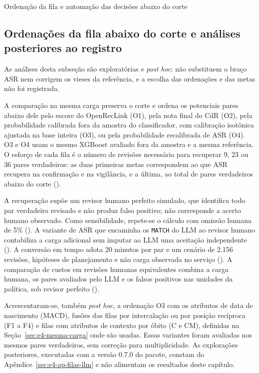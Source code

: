 \begin{chapter}{Ordenação da fila e automação das decisões abaixo do corte}
\subsection{Ordenações da fila abaixo do corte e análises posteriores ao registro}\label{sec:e4-exploratorias-metodo}

As análises desta subseção são exploratórias e \textit{post hoc}: não substituem o braço ASR nem corrigem os vieses da referência, e a escolha das ordenações e das metas não foi registrada.

A comparação na mesma carga preserva o corte e ordena os potenciais pares abaixo dele pelo escore do OpenRecLink (O1), pela nota final do CdR (O2), pela probabilidade calibrada fora da amostra do classificador, com calibração isotônica ajustada na base inteira (O3), ou pela probabilidade recalibrada de ASR (O4). O3 e O4 usam o mesmo XGBoost avaliado fora da amostra e a mesma referência. O esforço de cada fila é o número de revisões necessário para recuperar 9, 23 ou 36 pares verdadeiros: as duas primeiras metas correspondem ao que ASR recupera na confirmação e na vigilância, e a última, ao total de pares verdadeiros abaixo do corte ().

A recuperação supõe um revisor humano perfeito simulado, que identifica todo par verdadeiro revisado e não produz falso positivo; não corresponde a acerto humano observado. Como sensibilidade, repete-se o cálculo com omissão humana de 5\% (). A variante de ASR que encaminha os \texttt{MATCH} do LLM ao revisor humano contabiliza a carga adicional sem imputar ao LLM uma aceitação independente (). A conversão em tempo adota 20 minutos por par e um cenário de 2.156 revisões, hipóteses de planejamento e não carga observada no serviço (). A comparação de custos em revisões humanas equivalentes combina a carga humana, os pares avaliados pelo LLM e os falsos positivos nas unidades da política, sob revisor perfeito ().

Acrescentaram-se, também \textit{post hoc}, a ordenação O3 com os atributos de data de nascimento (MACD), fusões das filas por intercalação ou por posição recíproca (F1 a F4) e filas com atributos de contexto por óbito (C e CM), definidas na Seção~\ref{sec:e4-mesma-carga} onde são usadas. Essas variantes foram avaliadas nos mesmos pares verdadeiros, sem correção para multiplicidade. As explorações posteriores, executadas com a versão 0.7.0 do pacote, constam do Apêndice~\ref{sec:e4-ap-filas-llm} e não alimentam os resultados deste capítulo.


\end{chapter}

